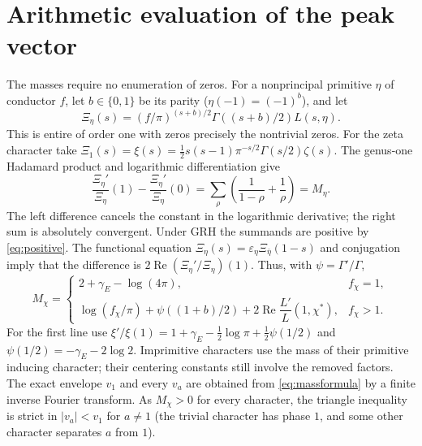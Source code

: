 \documentclass[11pt]{article}
\theoremstyle{remark}\newtheorem{remark}[theorem]{Remark}
\newcommand{\Rea}{\operatorname{Re}}
\begin{document}
\section{Arithmetic evaluation of the peak vector}
The masses require no enumeration of zeros. For a nonprincipal primitive $\eta$ of conductor $f$, let $b\in\{0,1\}$ be its parity ($\eta(-1)=(-1)^b$), and let
\[
 \Xi_\eta(s)=(f/\pi)^{(s+b)/2}\Gamma((s+b)/2)L(s,\eta).
\]
This is entire of order one with zeros precisely the nontrivial zeros. For the zeta character take $\Xi_1(s)=\xi(s)=\tfrac12 s(s-1)\pi^{-s/2}\Gamma(s/2)\zeta(s)$. The genus-one Hadamard product and logarithmic differentiation give
\begin{equation}\label{eq:mass}
 \frac{\Xi_\eta'}{\Xi_\eta}(1)-\frac{\Xi_\eta'}{\Xi_\eta}(0)
 =\sum_\rho\left(\frac1{1-\rho}+\frac1\rho\right)=M_\eta.
\end{equation}
The left difference cancels the constant in the logarithmic derivative; the right sum is absolutely convergent. Under GRH the summands are positive by \eqref{eq:positive}. The functional equation $\Xi_\eta(s)=\varepsilon_\eta\Xi_{\bar\eta}(1-s)$ and conjugation imply that the difference is $2\Rea(\Xi_\eta'/\Xi_\eta)(1)$. Thus, with $\psi=\Gamma'/\Gamma$,
\begin{equation}\label{eq:massformula}
 M_\chi=\begin{cases}
 2+\gamma_E-\log(4\pi),& f_\chi=1,\\
 \log(f_\chi/\pi)+\psi((1+b)/2)
 +2\Rea\dfrac{L'}{L}(1,\chi^*),& f_\chi>1.
 \end{cases}
\end{equation}
For the first line use $\xi'/\xi(1)=1+\gamma_E-\tfrac12\log\pi+\tfrac12\psi(1/2)$ and $\psi(1/2)=-\gamma_E-2\log2$. Imprimitive characters use the mass of their primitive inducing character; their centering constants still involve the removed factors. The exact envelope $v_1$ and every $v_a$ are obtained from \eqref{eq:massformula} by a finite inverse Fourier transform. As $M_\chi>0$ for every character, the triangle inequality is strict in $|v_a|<v_1$ for $a\ne1$ (the trivial character has phase $1$, and some other character separates $a$ from $1$).
\end{document}

